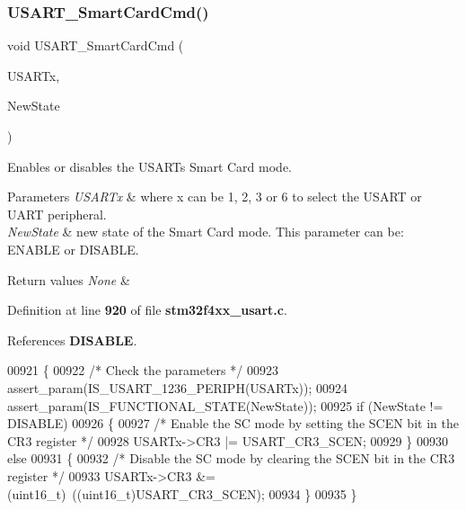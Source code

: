 \subsubsection{U\+S\+A\+R\+T\+\_\+\+Smart\+Card\+Cmd()}
{\footnotesize\ttfamily void U\+S\+A\+R\+T\+\_\+\+Smart\+Card\+Cmd (\begin{DoxyParamCaption}\item[{\textbf{ U\+S\+A\+R\+T\+\_\+\+Type\+Def} $\ast$}]{U\+S\+A\+R\+Tx,  }\item[{\textbf{ Functional\+State}}]{New\+State }\end{DoxyParamCaption})}



Enables or disables the U\+S\+A\+RT\textquotesingle{}s Smart Card mode. 


\begin{DoxyParams}{Parameters}
{\em U\+S\+A\+R\+Tx} & where x can be 1, 2, 3 or 6 to select the U\+S\+A\+RT or U\+A\+RT peripheral. \\
\hline
{\em New\+State} & new state of the Smart Card mode. This parameter can be\+: E\+N\+A\+B\+LE or D\+I\+S\+A\+B\+LE. \\
\hline
\end{DoxyParams}

\begin{DoxyRetVals}{Return values}
{\em None} & \\
\hline
\end{DoxyRetVals}


Definition at line \textbf{ 920} of file \textbf{ stm32f4xx\+\_\+usart.\+c}.



References \textbf{ D\+I\+S\+A\+B\+LE}.


\begin{DoxyCode}
00921 \{
00922   \textcolor{comment}{/* Check the parameters */}
00923   assert_param(IS_USART_1236_PERIPH(USARTx));
00924   assert_param(IS_FUNCTIONAL_STATE(NewState));
00925   \textcolor{keywordflow}{if} (NewState != DISABLE)
00926   \{
00927     \textcolor{comment}{/* Enable the SC mode by setting the SCEN bit in the CR3 register */}
00928     USARTx->CR3 |= USART_CR3_SCEN;
00929   \}
00930   \textcolor{keywordflow}{else}
00931   \{
00932     \textcolor{comment}{/* Disable the SC mode by clearing the SCEN bit in the CR3 register */}
00933     USARTx->CR3 &= (uint16\_t)~((uint16\_t)USART_CR3_SCEN);
00934   \}
00935 \}
\end{DoxyCode}
\mbox{\label{group__USART__Group6_ga62e22f47e38aa53f2edce8771f7a5dfa}} 
